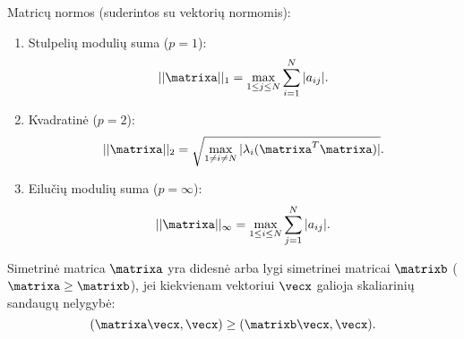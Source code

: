Matricų normos (suderintos su vektorių normomis):
\begin{enumerate}
  \item Stulpelių modulių suma ($p=1$):
    \begin{equation*}
      ||\matrixa||_{1} = \max_{1 \leq j \leq N} \sum_{i=1}^{N} |a_{ij}|.
    \end{equation*}
  \item Kvadratinė ($p=2$):
    \begin{equation*}
      ||\matrixa||_{2}
        = \sqrt{\max_{1 \neq i \neq N} |\lambda_{i}(\matrixa^{T}\matrixa)|}.
    \end{equation*}
  \item Eilučių modulių suma ($p=\infty$):
    \begin{equation*}
      ||\matrixa||_{\infty} = \max_{1 \leq i \leq N} \sum_{j=1}^{N}|a_{ij}|.
    \end{equation*}
\end{enumerate}












\begin{defn}
  Simetrinė matrica $\matrixa$ yra didesnė arba lygi simetrinei matricai
  $\matrixb$ ($\matrixa \geq \matrixb$), jei kiekvienam vektoriui
  $\vecx$ galioja skaliarinių sandaugų nelygybė:
  \begin{equation*}
    (\matrixa\vecx, \vecx) \geq (\matrixb\vecx, \vecx).
  \end{equation*}
\end{defn}

